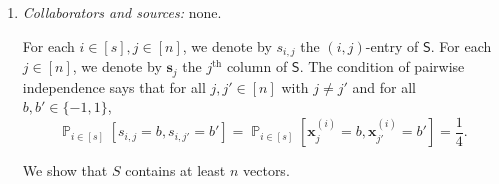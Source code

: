 \documentclass[letterpaper, reqno,11pt]{article}
\newcommand{\PP}{\mathop{{}\mathbb{P}}}
\begin{document}
\begin{enumerate}
\begin{enumerate}
\begin{proof}
      Now, let $S, S' \subset [\ell]$ be such that $S \neq S'$, $S \neq \emptyset$ and $S' \neq \emptyset$. Let $b, b' \in \{ -1, 1 \}$. Then
      \begin{align}
        \PP\left[C_S = b, C_{S'} = b'\right] &= \sum_{\beta \in \{ -1, 1 \}} \PP\left[C_{S \cap S'} = \beta\right] \PP\left[C_S = b, C_{S'} = b' \;\middle|\; C_{S \cap S'} = \beta\right] \nonumber \\
        &= \sum_{\beta \in \{ -1, 1 \}} \PP\left[C_{S \cap S'} = \beta\right] \PP\left[C_{S \setminus S'} = b \beta, C_{S' \setminus S} = b' \beta\right] \nonumber \\
        &= \sum_{\beta \in \{ -1, 1 \}} \PP\left[C_{S \cap S'} = \beta\right] \PP\left[C_{S \setminus S'} = b \beta\right] \PP\left[C_{S' \setminus S} = b' \beta\right] \label{eq:1a-indep} \\
        &= \sum_{\beta \in \{ -1, 1 \}} \frac{1}{2} \cdot \frac{1}{2} \cdot \frac{1}{2} = 2 \cdot \frac{1}{8} = \frac{1}{4} = \frac{1}{2} \cdot \frac{1}{2} = \PP\left[C_S = b\right] \PP\left[C_S = b'\right]. \nonumber
      \end{align}
      Note that \eqref{eq:1a-indep} follows from the fact that $S \setminus S'$ and $S' \setminus S$ are disjoint and thus that $C_{S \setminus S'}$ and $C_{S' \setminus S}$ are independent. This completes the proof that the $n = 2^{\ell} - 1$ random bits $C_S$ for $S \subset [\ell]$ with $S \neq \emptyset$ are pairwise independent.
    \end{proof}

    \clearpage

    \item \noindent\emph{Collaborators and sources:} none.

    \bigskip

    For each $i \in [s], j \in [n]$, we denote by $s_{i, j}$ the $(i, j)$-entry of $\mathsf{S}$. For each $j \in [n]$, we denote by $\mathbf s_j$ the $j^\text{th}$ column of $\mathsf{S}$. The condition of pairwise independence says that for all $j, j' \in [n]$ with $j \neq j'$ and for all $b, b' \in \{ -1, 1 \}$,
    \begin{equation} \label{eq:1b-pw-indep}
      \PP_{i \in [s]} \left[s_{i, j} = b, s_{i, j'} = b'\right] = \PP_{i \in [s]}\left[\mathbf x_j^{(i)} = b, \mathbf x_{j'}^{(i)} = b'\right] = \frac{1}{4}.
    \end{equation}

    We show that $S$ contains at least $n$ vectors.


\end{enumerate}
\end{enumerate}
\end{document}
